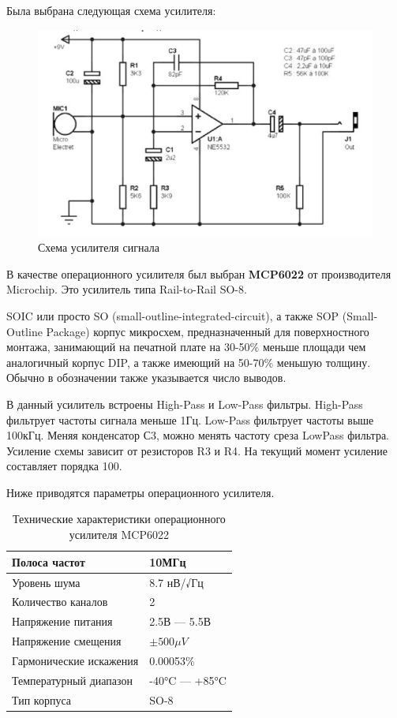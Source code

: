 Была выбрана следующая схема усилителя:

\begin{figure}[H]
\centering
\includegraphics[width=14cm]{circuit.jpg}
\caption{Схема усилителя сигнала}
\end{figure}

В качестве операционного усилителя был выбран \textbf{MCP6022} от производителя Microchip. Это усилитель типа Rail-to-Rail SO-8.

SOIC или просто SO (small-outline-integrated-circuit), а также SOP (Small-Outline Package) корпус микросхем, предназначенный для поверхностного монтажа, занимающий на печатной плате на 30-50\% меньше площади чем аналогичный корпус DIP, а также имеющий на 50-70\% меньшую толщину. Обычно в обозначении также указывается число выводов.

В данный усилитель встроены High-Pass и Low-Pass фильтры. High-Pass фильтрует частоты сигнала меньше 1Гц. Low-Pass фильтрует частоты выше 100кГц. Меняя конденсатор С3, можно менять частоту среза LowPass фильтра. Усиление схемы зависит от резисторов R3 и R4. На текущий момент усиление составляет порядка 100.

Ниже приводятся параметры операционного усилителя.

\begin{table}[h]
\centering
\label{my-label}
\begin{tabular}{|l|l|}
\hline
Полоса частот                  & 10МГц                      \\ \hline
Уровень шума                   & 8.7 нВ/√Гц                 \\ \hline
Количество каналов             & 2                          \\ \hline
Напряжение питания             & 2.5В --- 5.5В              \\ \hline
Напряжение смещения            & $\pm500\mu V $             \\ \hline
Гармонические искажения        & 0.00053\%                  \\ \hline
Температурный диапазон         & -40°C --- +85°C            \\ \hline
Тип корпуса                    & SO-8                       \\ \hline
\end{tabular}
\caption{Технические характеристики операционного усилителя MCP6022}
\end{table}

